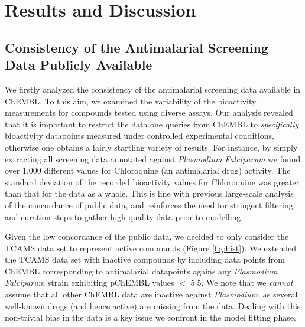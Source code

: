 \documentclass[journal=jacsat,manuscript=article]{achemso}
\begin{document}
\section*{Results and Discussion}

\subsection*{Consistency of the Antimalarial Screening Data Publicly Available}

We firstly analyzed the consistency of the antimalarial screening data available in ChEMBL. To this aim, we examined the variability of the bioactivity measurements for compounds tested using diverse assays. Our analysis revealed that it is important to restrict the data one queries from ChEMBL to \textit{specifically} bioactivity datapoints measured  under controlled experimental conditions, otherwise one obtains a fairly startling variety of results. For instance, by simply extracting all screening data annotated against \textit{Plasmodium Falciparum} we found over 1,000 different values for Chloroquine (an antimalarial drug) activity. The standard deviation of the recorded bioactivity values for Chloroquine was greater than that for the data as a whole. This is line with previous large-scale analysis of the concordance of public data\cite{Kalliokoski2013,Kalliokoski2013B,Cortes-Ciriano2015}, and reinforces the need for stringent filtering and curation steps to gather high quality data prior to modelling.


Given the low concordance of the public data, we decided to only consider the TCAMS data set to represent active compounds (Figure \ref{fig:hist}). We extended the TCAMS data set with inactive compounds by including  data points from ChEMBL corresponding to antimalarial datapoints agains any \textit{Plasmodium Falciparum} strain exhibiting pChEMBL values $<$ 5.5.
We note that we \textit{cannot} assume that all other ChEMBL data are inactive against \textit{Plasmodium}, as several well-known drugs (and hence active) are missing from the data. Dealing with this non-trivial bias in the data is a key issue we confront in the model fitting phase.\newline
\end{document}
